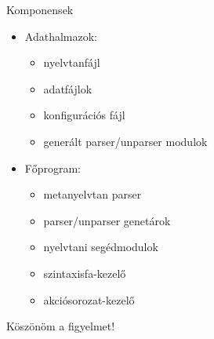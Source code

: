 \documentclass[10pt]{beamer}
\begin{document}
\begin{frame}{Komponensek}
  \begin{itemize}
  \item Adathalmazok:
      \begin{itemize}
        \item nyelvtanfájl
        \item adatfájlok
        \item konfigurációs fájl
        \item generált parser/unparser modulok
      \end{itemize}
    \item Főprogram:
      \begin{itemize}
        \item metanyelvtan parser
        \item parser/unparser genetárok
        \item nyelvtani segédmodulok
        \item szintaxisfa-kezelő
        \item akciósorozat-kezelő
      \end{itemize}
  \end{itemize}
\end{frame}

\begin{frame}[standout]
  Köszönöm a figyelmet!
\end{frame}
\end{document}
